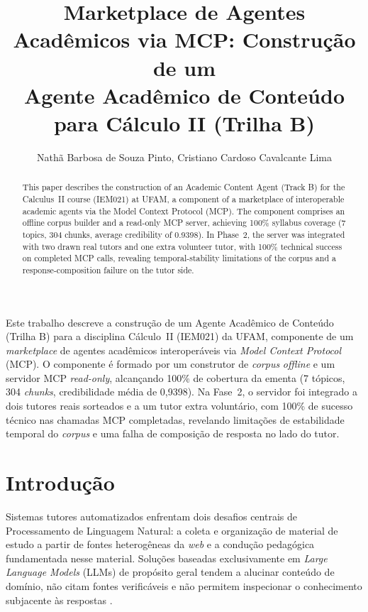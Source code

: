 \documentclass[12pt]{article}
\title{Marketplace de Agentes Acadêmicos via MCP: Construção de um\\
Agente Acadêmico de Conteúdo para Cálculo II (Trilha B)}
\author{Nathã Barbosa de Souza Pinto, Cristiano Cardoso Cavalcante Lima}
\begin{document}
\maketitle

\begin{resumo}
Este trabalho descreve a construção de um Agente Acadêmico de Conteúdo (Trilha B) para a
disciplina Cálculo~II (IEM021) da UFAM, componente de um \textit{marketplace} de agentes
acadêmicos interoperáveis via \textit{Model Context Protocol} (MCP). O componente é formado por um
construtor de \textit{corpus} \textit{offline} e um servidor MCP \textit{read-only}, alcançando 100\%
de cobertura da ementa (7 tópicos, 304 \textit{chunks}, credibilidade média de 0,9398). Na Fase~2,
o servidor foi integrado a dois tutores reais sorteados e a um tutor extra voluntário, com 100\%
de sucesso técnico nas chamadas MCP completadas, revelando limitações de estabilidade temporal do
\textit{corpus} e uma falha de composição de resposta no lado do tutor.
\end{resumo}

\begin{abstract}
This paper describes the construction of an Academic Content Agent (Track B) for the Calculus~II
course (IEM021) at UFAM, a component of a marketplace of interoperable academic agents via the
Model Context Protocol (MCP). The component comprises an offline corpus builder and a read-only
MCP server, achieving 100\% syllabus coverage (7 topics, 304 chunks, average credibility of
0.9398). In Phase~2, the server was integrated with two drawn real tutors and one extra volunteer
tutor, with 100\% technical success on completed MCP calls, revealing temporal-stability
limitations of the corpus and a response-composition failure on the tutor side.
\end{abstract}

\section{Introdução}

Sistemas tutores automatizados enfrentam dois desafios centrais de Processamento de Linguagem
Natural: a coleta e organização de material de estudo a partir de fontes heterogêneas da
\textit{web} e a condução pedagógica fundamentada nesse material. Soluções baseadas exclusivamente
em \textit{Large Language Models} (LLMs) de propósito geral tendem a alucinar conteúdo de domínio,
não citam fontes verificáveis e não permitem inspecionar o conhecimento subjacente às respostas
\cite{mcp}.
\end{document}
